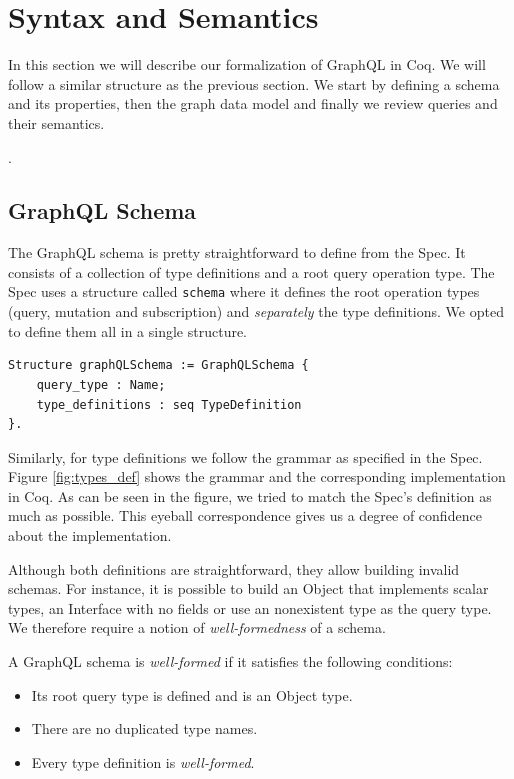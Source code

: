 
\section{Syntax and Semantics}\label{sec:form}
In this section we will describe our formalization of GraphQL in Coq. We will follow a similar structure as the previous section. We start by defining a schema and its properties, then the graph data model and finally we review queries and their semantics.

.

\subsection{GraphQL Schema}

The GraphQL schema is pretty straightforward to define from the Spec. It consists of a collection of type definitions and a root query operation type. The Spec uses a structure called \texttt{schema} where it defines the root operation types (query, mutation and subscription) and \textit{separately} the type definitions. We opted to define them all in a single structure.

\begin{verbatim}
Structure graphQLSchema := GraphQLSchema {
    query_type : Name;
    type_definitions : seq TypeDefinition
}.
\end{verbatim}

Similarly, for type definitions we follow the grammar as specified in the Spec. Figure \ref{fig:types_def} shows the grammar and the corresponding implementation in Coq. As can be seen in the figure, we tried to match the Spec's definition as much as possible. This eyeball correspondence gives us a degree of confidence about the implementation.  %

Although both definitions are straightforward, they allow building invalid schemas. For instance, it is possible to build an Object that implements scalar types, an Interface with no fields or use an nonexistent type as the query type. We therefore require a notion of \textit{well-formedness} of a schema.

\begin{definition}
A GraphQL schema is \textit{well-formed} if it satisfies the following conditions:
\begin{itemize}
    \item Its root query type is defined and is an Object type.
    \item There are no duplicated type names.
    \item Every type definition is \textit{well-formed}.
\end{itemize}
\end{definition}

